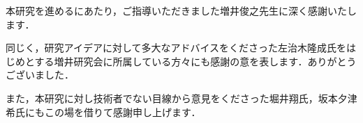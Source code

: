 \begin{acknowledgment}

本研究を進めるにあたり，ご指導いただきました増井俊之先生に深く感謝いたします．

同じく，研究アイデアに対して多大なアドバイスをくださった左治木隆成氏をはじめとする増井研究会に所属している方々にも感謝の意を表します．ありがとうございました．

また，本研究に対し技術者でない目線から意見をくださった堀井翔氏，坂本夕津希氏にもこの場を借りて感謝申し上げます．

\end{acknowledgment}
